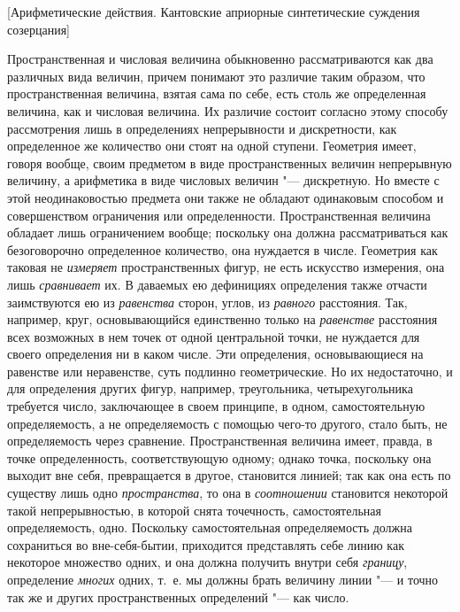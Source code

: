 %
{[Арифметические действия. Кантовские априорные синтетические
суждения созерцания]}

Пространственная и числовая величина обыкновенно рассматриваются как два
различных вида величин, причем понимают это различие таким образом, что
пространственная величина, взятая сама по себе, есть столь же определенная
величина, как и числовая величина. Их различие состоит согласно этому способу
рассмотрения лишь в определениях непрерывности и дискретности, как определенное
же количество они стоят на одной ступени. Геометрия имеет, говоря вообще, своим
предметом в виде пространственных величин непрерывную величину, а арифметика в
виде числовых величин "--- дискретную. Но вместе с этой неодинаковостью
предмета они также не обладают одинаковым способом и совершенством ограничения
или определенности. Пространственная величина обладает лишь ограничением
вообще; поскольку она должна рассматриваться как безоговорочно определенное
количество, она нуждается в числе. Геометрия как таковая не {\em измеряет}
пространственных фигур, не есть искусство измерения, она лишь {\em сравнивает}
их. В даваемых ею дефинициях определения также отчасти заимствуются ею из
{\em равенства} сторон, углов, из {\em равного} расстояния. Так, например,
круг, основывающийся единственно только на {\em равенстве} расстояния всех
возможных в нем точек от одной центральной точки, не нуждается для своего
определения ни в каком числе. Эти определения, основывающиеся на равенстве или
неравенстве, суть подлинно геометрические. Но их недостаточно, и для
определения других фигур, например, треугольника, четырехугольника требуется
число, заключающее в своем принципе, в одном, самостоятельную определяемость,
а не определяемость с помощью чего-то другого, стало быть, не определяемость
через сравнение. Пространственная величина имеет, правда, в точке
определенность, соответствующую одному; однако точка, поскольку она выходит вне
себя, превращается в другое, становится линией; так как она есть по существу
лишь одно {\em пространства}, то она в {\em соотношении} становится некоторой
такой непрерывностью, в которой снята точечность, самостоятельная
определяемость, одно. Поскольку самостоятельная определяемость должна
сохраниться во вне-себя-бытии, приходится представлять себе линию как некоторое
множество одних, и она должна получить внутри себя {\em границу}, определение
{\em многих} одних, т.~е. мы должны брать величину линии "--- и точно так же и
других пространственных определений "--- как число.

